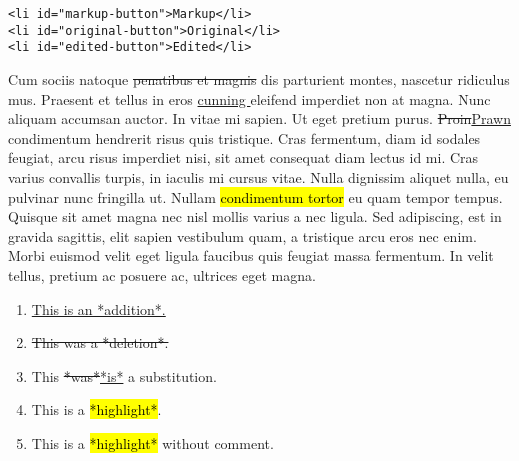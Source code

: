 \hypertarget{criticnav}{}
\begin{verbatim}
<li id="markup-button">Markup</li>
<li id="original-button">Original</li>
<li id="edited-button">Edited</li>
\end{verbatim}

\hypertarget{wrapper}{}
Cum sociis natoque
\st{penatibus et magnis} dis
parturient montes, nascetur ridiculus mus. Praesent et tellus in eros
\underline{cunning }eleifend
imperdiet non at magna. Nunc aliquam accumsan auctor. In vitae mi
sapien. Ut eget pretium purus.
\st{Proin}\underline{Prawn}
condimentum hendrerit risus quis tristique. Cras fermentum, diam id
sodales feugiat, arcu risus imperdiet nisi, sit amet consequat diam
lectus id mi. Cras varius convallis turpis, in iaculis mi cursus vitae.
Nulla dignissim aliquet nulla, eu pulvinar nunc fringilla ut. Nullam
\hl{condimentum tortor} eu quam tempor tempus. Quisque
sit amet magna nec nisl mollis varius a nec ligula. Sed adipiscing, est
in gravida sagittis, elit sapien vestibulum quam, a
tristique arcu eros nec enim. Morbi euismod
velit eget ligula faucibus quis feugiat massa fermentum. In velit
tellus, pretium ac posuere ac, ultrices eget magna.

\begin{enumerate}
\def\labelenumi{\arabic{enumi}.}
\tightlist
\item
  \underline{This is an *addition*.}
\item
  \st{This was a *deletion*.}
\item
  This \st{*was*}\underline{*is*} a substitution.
\item
  This is a
  \hl{*highlight*}.
\item
  This is a \hl{*highlight*} without comment.
\end{enumerate}